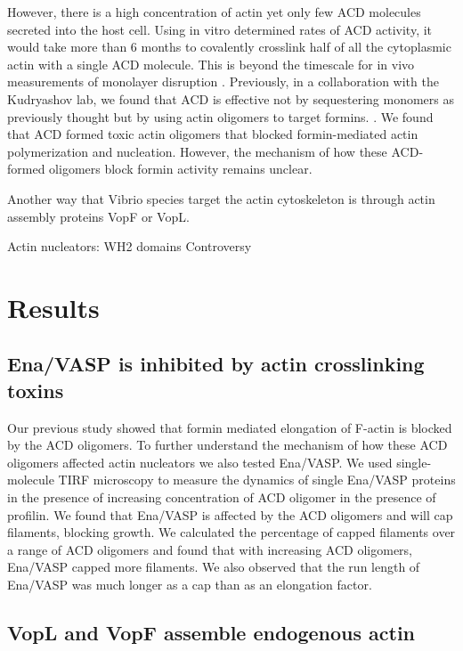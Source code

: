 However, there is a high concentration of actin yet only few ACD molecules secreted into the host cell. Using in vitro determined rates of ACD activity, it would take more than 6 months to covalently crosslink half of all the cytoplasmic actin with a single ACD molecule. This is beyond the timescale for in vivo measurements of monolayer disruption \citep{}. Previously, in a collaboration with the Kudryashov lab, we found that ACD is effective not by sequestering monomers as previously thought but by using actin oligomers to target formins. \citep{heisler_acd_2015}. We found that ACD formed toxic actin oligomers that blocked formin-mediated actin polymerization and nucleation. However, the mechanism of how these ACD-formed oligomers block formin activity remains unclear. 

Another way that Vibrio species target the actin cytoskeleton is through actin assembly proteins VopF or VopL. \citep{burke_bacterial_2017}

Actin nucleators: WH2 domains
	Controversy


\section{Results}\label{ch04-results}

\subsection{Ena/VASP is inhibited by actin crosslinking toxins}\label{ena-acd-oligomers}
Our previous study showed that formin mediated elongation of F-actin is blocked by the ACD oligomers. To further understand the mechanism of how these ACD oligomers affected actin nucleators we also tested Ena/VASP. We used single-molecule TIRF microscopy to measure the dynamics of single Ena/VASP proteins in the presence of increasing concentration of ACD oligomer in the presence of profilin. We found that Ena/VASP is affected by the ACD oligomers and will cap filaments, blocking growth. We calculated the percentage of capped filaments over a range of ACD oligomers and found that with increasing ACD oligomers, Ena/VASP capped more filaments. We also observed that the run length of Ena/VASP was much longer as a cap than as an elongation factor. 

\subsection{VopL and VopF assemble endogenous actin}\label{vops}

